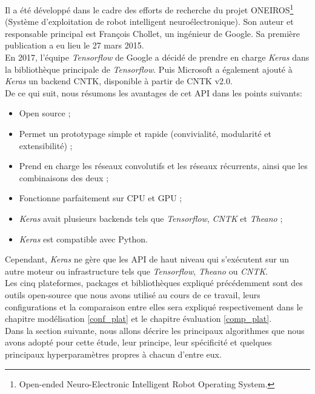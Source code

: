 Il a été développé dans le cadre des efforts de recherche du projet ONEIROS\footnote{Open-ended Neuro-Electronic Intelligent Robot Operating System.} (Système d’exploitation de robot intelligent neuroélectronique). Son auteur et responsable principal est François Chollet, un ingénieur de Google. Sa première publication a eu lieu le 27 mars 2015.\\

En 2017, l'équipe \textit{Tensorflow} de Google a décidé de prendre en charge \textit{Keras} dans la bibliothèque principale de \textit{Tensorflow}. Puis Microsoft a également ajouté à \textit{Keras} un backend CNTK, disponible à partir de CNTK v2.0.\\

De ce qui suit, nous résumons les avantages de cet API dans les points suivants: 
\begin{itemize}
\item[\textbullet] Open source ;
\item[\textbullet] Permet un prototypage simple et rapide (convivialité, modularité et extensibilité) ;
\item[\textbullet] Prend en charge les réseaux convolutifs et les réseaux récurrents, ainsi que les combinaisons des deux ;
\item[\textbullet] Fonctionne parfaitement sur CPU et GPU ;
\item[\textbullet] \textit{Keras} avait plusieurs backends tels que \textit{Tensorflow}, \textit{CNTK} et \textit{Theano} ;
\item[\textbullet] \textit{Keras} est compatible avec Python.\\
\end{itemize}


Cependant, \textit{Keras} ne gère que les API de haut niveau qui s'exécutent sur un autre moteur ou infrastructure tels que \textit{Tensorflow}, \textit{Theano} ou \textit{CNTK}.\\


Les cinq plateformes, packages et bibliothèques expliqué précédemment sont des outils open-source que nous avons utilisé au cours de ce travail, leurs configurations et la comparaison entre elles sera expliqué respectivement dans le chapitre modélisation \ref{conf_plat} et le chapitre évaluation \ref{comp_plat}. \\

Dans la section suivante, nous allons décrire les principaux algorithmes que nous avons adopté pour cette étude, leur principe, leur spécificité et quelques principaux hyperparamètres propres à chacun d'entre eux. 



